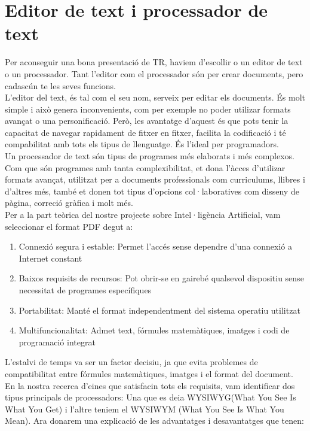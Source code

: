 \section{Editor de text i processador de text}\label{4.2}
Per aconseguir una bona presentació de TR, haviem d'escollir o un editor de text o un processador. Tant l'editor com el processador són per crear documents, pero cadascún te les seves funcions.\\
L'editor del text, és tal com el seu nom, serveix per editar els documents. És molt simple i això genera inconvenients, com per exemple no poder utilizar formats avançat o una personificació. Però, les avantatge d'aquest és que pots tenir la capacitat de navegar rapidament de fitxer en fitxer, facilita la codificació i té compabilitat amb tots els tipus de llenguatge. És l'ideal per programadors.\\
Un processador de text són tipus de programes més elaborats i més complexos. Com que són programes amb tanta complexibilitat, et dona l'àcces d'utilizar formats avançat, utilitzat per a documents professionals com curriculums, llibres i d'altres més, també et donen tot tipus d'opcions col·laboratives com disseny de pàgina, correció gràfica i molt més.\\
Per a la part teòrica del nostre projecte sobre Intel·ligència Artificial, vam seleccionar el format PDF degut a:
\begin{enumerate}
 \item Connexió segura i estable: Permet l'accés sense dependre d'una connexió a Internet constant
 \item Baixos requisits de recursos: Pot obrir-se en gairebé qualsevol dispositiu sense necessitat de programes específiques
 \item Portabilitat: Manté el format independentment del sistema operatiu utilitzat
 \item Multifuncionalitat: Admet text, fórmules matemàtiques, imatges i codi de programació integrat
\end{enumerate}
L'estalvi de temps va ser un factor decisiu, ja que evita problemes de compatibilitat entre fórmules matemàtiques, imatges i el format del document.
En la nostra recerca d'eines que satisfacin tots els requisits, vam identificar dos tipus principals de processadors: Una que es deia WYSIWYG(What You See Is What You Get) i l'altre teniem el WYSIWYM (What You See Is What You Mean). Ara donarem una explicació de les advantatges i desavantatges que tenen:
